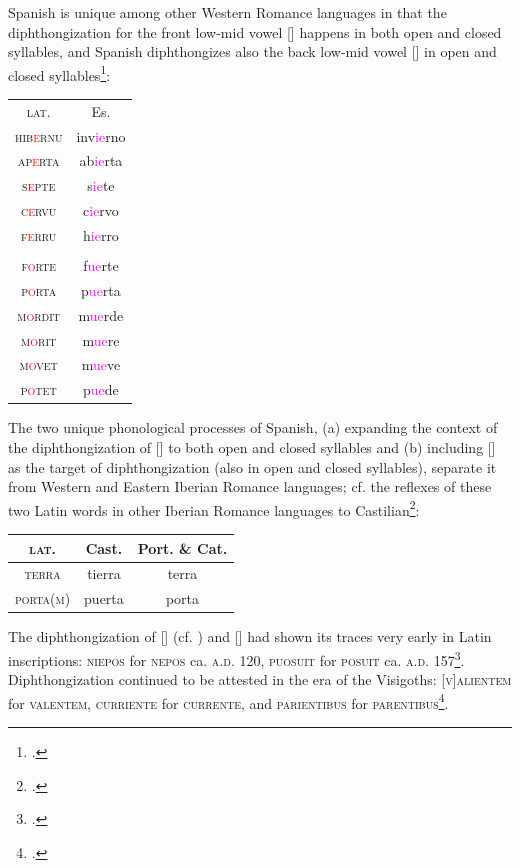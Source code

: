 \documentclass{report}[12pt]
\begin{document}
Spanish is unique among other Western Romance languages in that the diphthongization for the front low-mid vowel [] happens in both open and closed syllables, and Spanish diphthongizes also the back low-mid vowel [] in open and closed syllables\footcites[p.~122]{lloyd_spanish}[p.~15-16]{romance_his}:
\begin{center}
\begin{tabular}{c c}
  \textsc{lat.} & Es. \\
  \textsc{hib\textcolor{red}{e}rnu} & inv\textcolor{magenta}{ie}rno \\
  \textsc{ap\textcolor{red}{e}rta} & ab\textcolor{magenta}{ie}rta \\
  \textsc{s\textcolor{red}{e}pte} & s\textcolor{magenta}{ie}te \\
  \textsc{c\textcolor{red}{e}rvu} & c\textcolor{magenta}{ie}rvo \\
  \textsc{f\textcolor{red}{e}rru} & h\textcolor{magenta}{ie}rro \\
  & \\
  \textsc{f\textcolor{red}{o}rte} & f\textcolor{magenta}{ue}rte \\
  \textsc{p\textcolor{red}{o}rta} & p\textcolor{magenta}{ue}rta \\
  \textsc{m\textcolor{red}{o}rdit} & m\textcolor{magenta}{ue}rde \\
  \textsc{m\textcolor{red}{o}rit} & m\textcolor{magenta}{ue}re \\
  \textsc{m\textcolor{red}{o}vet} & m\textcolor{magenta}{ue}ve \\
  \textsc{p\textcolor{red}{o}tet} & p\textcolor{magenta}{ue}de \\
\end{tabular}
\end{center}
The two unique phonological processes of Spanish, (a) expanding the context of the diphthongization of [] to both open and closed syllables and (b) including [] as the target of diphthongization (also in open and closed syllables), separate it from Western and Eastern Iberian Romance languages; cf. the reflexes of these two Latin words in other Iberian Romance languages to Castilian\footcite[p.~3]{hualde_iberian}:
\begin{center}
  \begin{tabular}{c c c}    
    \textsc{lat.} & Cast. & Port. \& Cat. \\
    \hline
    \textsc{terra} & tierra & terra \\
    \textsc{porta(m)} & puerta & porta \\
  \end{tabular}
\end{center}
The diphthongization of [] (cf. ) and [] had shown its traces very early in Latin inscriptions: \textsc{niepos} for \textsc{nepos} ca. \textsc{a.d.} 120, \textsc{puosuit} for \textsc{posuit} ca. \textsc{a.d.} 157\footcite[p.~129-130]{lloyd_spanish}. Diphthongization continued to be attested in the era of the Visigoths: \textsc{[v]alientem} for \textsc{valentem}, \textsc{curriente} for \textsc{currente}, and \textsc{parientibus} for \textsc{parentibus}\footcite[p.~130]{lloyd_spanish}.
\end{document}
